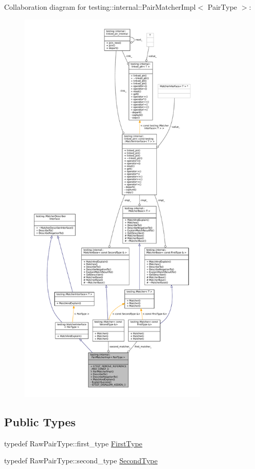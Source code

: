 Collaboration diagram for testing\+:\+:internal\+:\+:Pair\+Matcher\+Impl$<$ Pair\+Type $>$\+:
\nopagebreak
\begin{figure}[H]
\begin{center}
\leavevmode
\includegraphics[height=550pt]{classtesting_1_1internal_1_1PairMatcherImpl__coll__graph}
\end{center}
\end{figure}
\subsection*{Public Types}
\begin{DoxyCompactItemize}
\item 
typedef Raw\+Pair\+Type\+::first\+\_\+type \hyperlink{classtesting_1_1internal_1_1PairMatcherImpl_a9de66d76f0ebb0f107a9c18903b03176}{First\+Type}
\item 
typedef Raw\+Pair\+Type\+::second\+\_\+type \hyperlink{classtesting_1_1internal_1_1PairMatcherImpl_ad63c9ff4f1aff81562efca293ff5aca9}{Second\+Type}
\end{DoxyCompactItemize}
